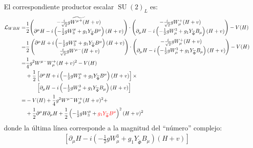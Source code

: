 \begin{frame}
El correspondiente productor escalar $\operatorname{\operatorname{SU}}(2)_L$ es:
\begin{align}
  \mathcal{L}_{WBH}=&\frac{1}{2}\widetilde{\begin{pmatrix}
    -\frac{i}{\sqrt{2}}g{W^\mu}^+(H+v)\\
    \partial^\mu H-i\left(-\frac{1}{2}gW_3^\mu+{g_1}Y_{\widetilde{\Phi}} B^\mu\right)(H+v)
  \end{pmatrix}}\cdot
   \begin{pmatrix}
    -\frac{i}{\sqrt{2}}gW_\mu^+(H+v)\\
    \partial_\mu H-i\left(-\frac{1}{2}gW^3_\mu+{g_1}Y_{\widetilde{\Phi}} B_\mu\right)(H+v)
  \end{pmatrix}-V(H)\nonumber\\
=&\frac{1}{2}\begin{pmatrix}
    \partial^\mu H+i\left(-\frac{1}{2}gW_3^\mu+{g_1}Y_{\widetilde{\Phi}} B^\mu\right)(H+v)\\
    \frac{i}{\sqrt{2}}g{W^\mu}^-(H+v)\\
  \end{pmatrix}\cdot
  \begin{pmatrix}
    -\frac{i}{\sqrt{2}}gW_\mu^+(H+v)\\
    \partial_\mu H-i\left(-\frac{1}{2}gW^3_\mu+{g_1}Y_{\widetilde{\Phi}} B_\mu\right)(H+v)
  \end{pmatrix}-V(H)\nonumber\\
  =&\frac{1}{4}g^2{W^\mu}^-W_\mu^+(H+v)^2-V(H)\nonumber\\
  &+\frac{1}{2}\left[\partial^\mu H+i\left(-\tfrac{1}{2}gW_3^\mu+{g_1}Y_{\widetilde{\Phi}} B^\mu\right)(H+v)\right]
  \times\nonumber\\
  &\qquad\left[\partial_\mu H-i\left(-\tfrac{1}{2}gW^3_\mu+{g_1}Y_{\widetilde{\Phi}} B_\mu\right)(H+v)\right]\nonumber\\
 =&-V(H)
  +\frac{1}{4}g^2{W^\mu}^-W_\mu^+(H+v)^2+\nonumber\\
  &+\frac{1}{2}\partial^\mu H\partial_\mu H+\frac{1}{2}\left(-\tfrac{1}{2}gW_3^\mu+{\color{red}{g_1}Y_{\widetilde{\Phi}} B^\mu}\right)^2(H+v)^2
\end{align}
donde la última línea corresponde a la magnitud del ``número'' complejo: 
\begin{align}
\left[\partial_\mu H-i\left(-\tfrac{1}{2}gW^3_\mu+{g_1}Y_{\widetilde{\Phi}} B_\mu\right)(H+v)\right]
\end{align}

\end{frame}
